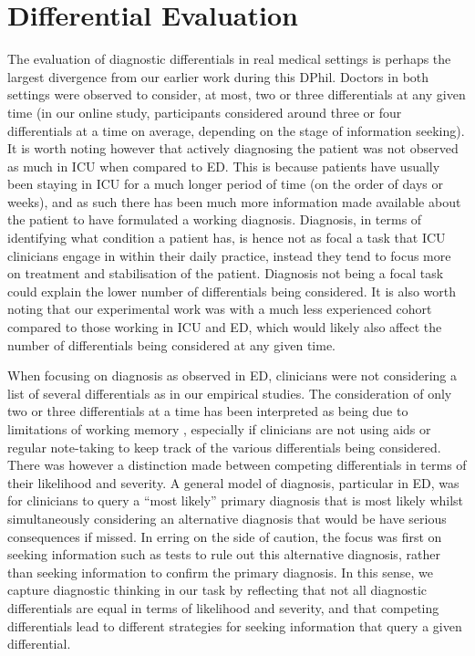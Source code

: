 \documentclass[a4paper, nobind]{templates/ociamthesis}
\begin{document}
\section{Differential Evaluation}\label{differential-evaluation}

The evaluation of diagnostic differentials in real medical settings is perhaps the largest divergence from our earlier work during this DPhil. Doctors in both settings were observed to consider, at most, two or three differentials at any given time (in our online study, participants considered around three or four differentials at a time on average, depending on the stage of information seeking). It is worth noting however that actively diagnosing the patient was not observed as much in ICU when compared to ED. This is because patients have usually been staying in ICU for a much longer period of time (on the order of days or weeks), and as such there has been much more information made available about the patient to have formulated a working diagnosis. Diagnosis, in terms of identifying what condition a patient has, is hence not as focal a task that ICU clinicians engage in within their daily practice, instead they tend to focus more on treatment and stabilisation of the patient. Diagnosis not being a focal task could explain the lower number of differentials being considered. It is also worth noting that our experimental work was with a much less experienced cohort compared to those working in ICU and ED, which would likely also affect the number of differentials being considered at any given time.

\hfill\break
When focusing on diagnosis as observed in ED, clinicians were not considering a list of several differentials as in our empirical studies. The consideration of only two or three differentials at a time has been interpreted as being due to limitations of working memory \autocite{gilhooly_cognitive_1990}, especially if clinicians are not using aids or regular note-taking to keep track of the various differentials being considered. There was however a distinction made between competing differentials in terms of their likelihood and severity. A general model of diagnosis, particular in ED, was for clinicians to query a ``most likely'' primary diagnosis that is most likely whilst simultaneously considering an alternative diagnosis that would be have serious consequences if missed. In erring on the side of caution, the focus was first on seeking information such as tests to rule out this alternative diagnosis, rather than seeking information to confirm the primary diagnosis. In this sense, we capture diagnostic thinking in our task by reflecting that not all diagnostic differentials are equal in terms of likelihood and severity, and that competing differentials lead to different strategies for seeking information that query a given differential.
\end{document}
